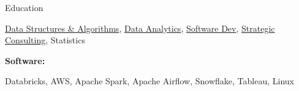 \documentclass{resume/resume}
\begin{document}
\begin{rSection}{Education}
\begin{adjustwidth}{6em}{0pt}
    \href{https://www.youtube.com/watch?v=lMFQp3wN-cg}{Data Structures \& Algorithms},
    \href{https://github.com/UtahTriangle/Laws/blob/main/Proposals/NationalsHelp/figures/distances.pdf}{Data Analytics}, %
    \href{https://github.com/spelkington}{Software Dev},
    \href{https://spelkington.github.io/assets/utah_office_update.pdf}{Strategic Consulting}, %
    Statistics
    
\end{adjustwidth}


%
%
%
\vspace{-3pt}
{\bf Software:}
\vspace{-1.83em}
\begin{adjustwidth}{6em}{0pt}
    Databricks,
    AWS,
    Apache Spark,
    Apache Airflow,
    Snowflake,
    Tableau,
    Linux

\end{adjustwidth}

\end{rSection}
\end{document}
